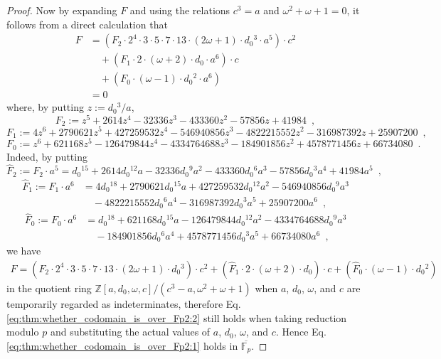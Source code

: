 \documentclass[10pt,a4paper]{amsart}
\newcommand{\FF}{\mathbb{F}}
\newcommand{\ZZ}{\mathbb{Z}}
\begin{document}
\begin{proof}
Now by expanding $F$ and using the relations $c^3 = a$ and $\omega^2 + \omega + 1 = 0$, it follows from a direct calculation that
\begin{equation}
\label{eq:thm:whether_codomain_is_over_Fp2:1}
\begin{split}
F
&= (F_2 \cdot 2^4 \cdot 3 \cdot 5 \cdot 7 \cdot 13 \cdot (2 \omega + 1) \cdot d_0{}^3 \cdot a^5) \cdot c^2 \\
&\quad + (F_1 \cdot 2 \cdot (\omega + 2) \cdot d_0 \cdot a^6) \cdot c \\
&\quad + (F_0 \cdot (\omega - 1) \cdot d_0{}^2 \cdot a^6) \\
&= 0
\end{split}
\end{equation}
where, by putting $z := d_0{}^3 / a$,
\[
F_2 := z^5 + 2614 z^4 - 32336 z^3 - 433360 z^2 - 57856 z + 41984 \enspace,
\]
\[
F_1 := 4 z^6 + 2790621 z^5 + 427259532 z^4 - 546940856 z^3 - 4822215552 z^2 - 316987392 z + 25907200 \enspace,
\]
\[
F_0 := z^6 + 621168 z^5 - 126479844 z^4 - 4334764688 z^3 - 184901856 z^2 + 4578771456 z + 66734080 \enspace.
\]
Indeed, by putting
\[
\widehat{F}_2
:= F_2 \cdot a^5
= d_0{}^{15} + 2614 d_0{}^{12} a - 32336 d_0{}^9 a^2 - 433360 d_0{}^6 a^3 - 57856 d_0{}^3 a^4 + 41984 a^5 \enspace,
\]
\[
\begin{split}
\widehat{F}_1
:= F_1 \cdot a^6
&= 4 d_0{}^{18} + 2790621 d_0{}^{15} a + 427259532 d_0{}^{12} a^2 - 546940856 d_0{}^9 a^3 \\
&\quad - 4822215552 d_0{}^6 a^4 - 316987392 d_0{}^3 a^5 + 25907200 a^6 \enspace,
\end{split}
\]
\[
\begin{split}
\widehat{F}_0
:= F_0 \cdot a^6
&= d_0{}^{18} + 621168 d_0{}^{15} a - 126479844 d_0{}^{12} a^2 - 4334764688 d_0{}^9 a^3 \\
&\quad - 184901856 d_0{}^6 a^4 + 4578771456 d_0{}^3 a^5 + 66734080 a^6 \enspace,
\end{split}
\]
we have
\begin{equation}
\label{eq:thm:whether_codomain_is_over_Fp2:2}
\begin{split}
F
= (\widehat{F}_2 \cdot 2^4 \cdot 3 \cdot 5 \cdot 7 \cdot 13 \cdot (2 \omega + 1) \cdot d_0{}^3) \cdot c^2 
+ (\widehat{F}_1 \cdot 2 \cdot (\omega + 2) \cdot d_0) \cdot c 
+ (\widehat{F}_0 \cdot (\omega - 1) \cdot d_0{}^2)
\end{split}
\end{equation}
in the quotient ring $\ZZ[a,d_0,\omega,c] / (c^3 - a, \omega^2 + \omega + 1)$ when $a$, $d_0$, $\omega$, and $c$ are temporarily regarded as indeterminates, therefore Eq.\eqref{eq:thm:whether_codomain_is_over_Fp2:2} still holds when taking reduction modulo $p$ and substituting the actual values of $a$, $d_0$, $\omega$, and $c$.
Hence Eq.\eqref{eq:thm:whether_codomain_is_over_Fp2:1} holds in $\overline{\FF_p}$.


\end{proof}
\end{document}
